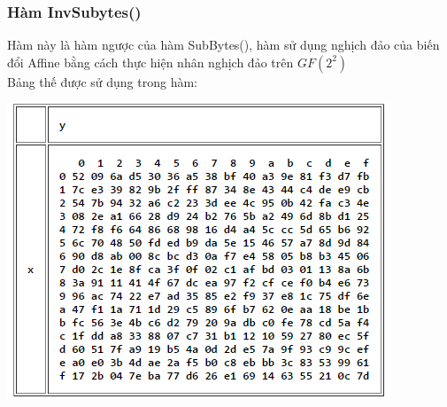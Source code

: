 \documentclass[paper=a4, fontsize=11pt]{scrartcl}	%
\numberwithin{equation}{section}															%
\numberwithin{figure}{section}																%
\numberwithin{table}{section}																%
\begin{document}
		\subsubsection{Hàm InvSubytes()}
		Hàm này là hàm ngược của hàm SubBytes(), hàm sử dụng nghịch đảo của biến đổi Affine bằng cách thực hiện nhân nghịch đảo trên $GF(2^2)$\\
		Bảng thế được sử dụng trong hàm:
		\begin{center}
		\includegraphics[scale=0.6]{AESInvSubByte}
		\end{center}
\end{document}
